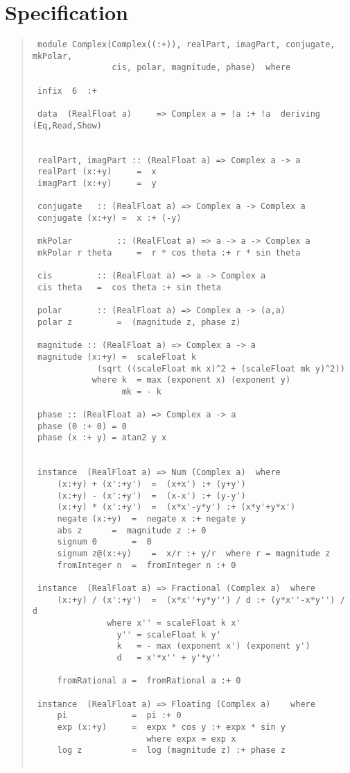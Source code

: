 \section{Specification
}
\begin{quote}
{\haddockverb\begin{verbatim}
 module Complex(Complex((:+)), realPart, imagPart, conjugate, mkPolar,
                cis, polar, magnitude, phase)  where
 
 infix  6  :+
 
 data  (RealFloat a)     => Complex a = !a :+ !a  deriving (Eq,Read,Show)
 
 
 realPart, imagPart :: (RealFloat a) => Complex a -> a
 realPart (x:+y)	 =  x
 imagPart (x:+y)	 =  y
 
 conjugate	 :: (RealFloat a) => Complex a -> Complex a
 conjugate (x:+y) =  x :+ (-y)
 
 mkPolar		 :: (RealFloat a) => a -> a -> Complex a
 mkPolar r theta	 =  r * cos theta :+ r * sin theta
 
 cis		 :: (RealFloat a) => a -> Complex a
 cis theta	 =  cos theta :+ sin theta
 
 polar		 :: (RealFloat a) => Complex a -> (a,a)
 polar z		 =  (magnitude z, phase z)
 
 magnitude :: (RealFloat a) => Complex a -> a
 magnitude (x:+y) =  scaleFloat k
 		     (sqrt ((scaleFloat mk x)^2 + (scaleFloat mk y)^2))
 		    where k  = max (exponent x) (exponent y)
 		          mk = - k
 
 phase :: (RealFloat a) => Complex a -> a
 phase (0 :+ 0) = 0
 phase (x :+ y) = atan2 y x
 
 
 instance  (RealFloat a) => Num (Complex a)  where
     (x:+y) + (x':+y')	=  (x+x') :+ (y+y')
     (x:+y) - (x':+y')	=  (x-x') :+ (y-y')
     (x:+y) * (x':+y')	=  (x*x'-y*y') :+ (x*y'+y*x')
     negate (x:+y)	=  negate x :+ negate y
     abs z		=  magnitude z :+ 0
     signum 0		=  0
     signum z@(x:+y)	=  x/r :+ y/r  where r = magnitude z
     fromInteger n	=  fromInteger n :+ 0
 
 instance  (RealFloat a) => Fractional (Complex a)  where
     (x:+y) / (x':+y')	=  (x*x''+y*y'') / d :+ (y*x''-x*y'') / d
 			   where x'' = scaleFloat k x'
 				 y'' = scaleFloat k y'
 				 k   = - max (exponent x') (exponent y')
 				 d   = x'*x'' + y'*y''
 
     fromRational a	=  fromRational a :+ 0
 
 instance  (RealFloat a) => Floating (Complex a)	where
     pi             =  pi :+ 0
     exp (x:+y)     =  expx * cos y :+ expx * sin y
                       where expx = exp x
     log z          =  log (magnitude z) :+ phase z
 

\end{verbatim}}
\end{quote}
